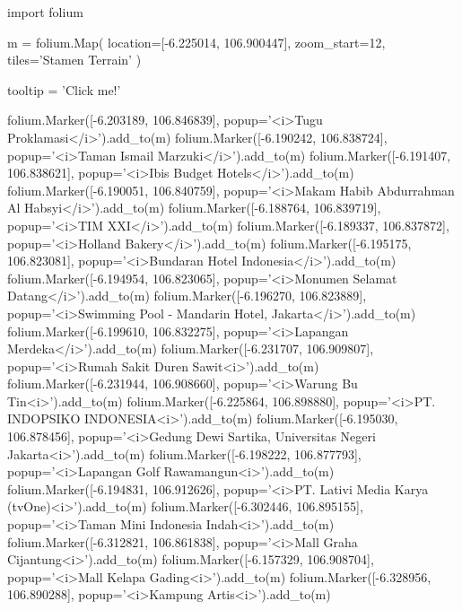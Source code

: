 import folium

m = folium.Map(
    location=[-6.225014, 106.900447],
    zoom_start=12,
    tiles='Stamen Terrain'
)

tooltip = 'Click me!'

folium.Marker([-6.203189, 106.846839], popup='<i>Tugu Proklamasi</i>').add_to(m)
folium.Marker([-6.190242, 106.838724], popup='<i>Taman Ismail Marzuki</i>').add_to(m)
folium.Marker([-6.191407, 106.838621], popup='<i>Ibis Budget Hotels</i>').add_to(m)
folium.Marker([-6.190051, 106.840759], popup='<i>Makam Habib Abdurrahman Al Habsyi</i>').add_to(m)
folium.Marker([-6.188764, 106.839719], popup='<i>TIM XXI</i>').add_to(m)
folium.Marker([-6.189337, 106.837872], popup='<i>Holland Bakery</i>').add_to(m)
folium.Marker([-6.195175, 106.823081], popup='<i>Bundaran Hotel Indonesia</i>').add_to(m)
folium.Marker([-6.194954, 106.823065], popup='<i>Monumen Selamat Datang</i>').add_to(m)
folium.Marker([-6.196270, 106.823889], popup='<i>Swimming Pool - Mandarin Hotel, Jakarta</i>').add_to(m)
folium.Marker([-6.199610, 106.832275], popup='<i>Lapangan Merdeka</i>').add_to(m)
folium.Marker([-6.231707, 106.909807], popup='<i>Rumah Sakit Duren Sawit<i>').add_to(m)
folium.Marker([-6.231944, 106.908660], popup='<i>Warung Bu Tin<i>').add_to(m)
folium.Marker([-6.225864, 106.898880], popup='<i>PT. INDOPSIKO INDONESIA<i>').add_to(m)
folium.Marker([-6.195030, 106.878456], popup='<i>Gedung Dewi Sartika, Universitas Negeri Jakarta<i>').add_to(m)
folium.Marker([-6.198222, 106.877793], popup='<i>Lapangan Golf Rawamangun<i>').add_to(m)
folium.Marker([-6.194831, 106.912626], popup='<i>PT. Lativi Media Karya (tvOne)<i>').add_to(m)
folium.Marker([-6.302446, 106.895155], popup='<i>Taman Mini Indonesia Indah<i>').add_to(m)
folium.Marker([-6.312821, 106.861838], popup='<i>Mall Graha Cijantung<i>').add_to(m)
folium.Marker([-6.157329, 106.908704], popup='<i>Mall Kelapa Gading<i>').add_to(m)
folium.Marker([-6.328956, 106.890288], popup='<i>Kampung Artis<i>').add_to(m)
